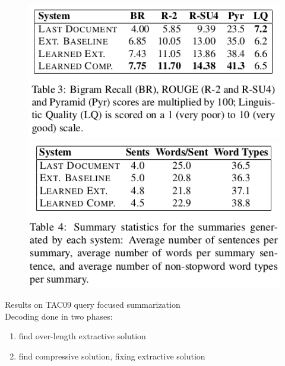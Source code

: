 \documentclass[xcolor={table}]{beamer}
\begin{document}
\begin{frame}[t]{\cite{berg2011jointly}}
      \begin{figure}[h]
          \centering
      \includegraphics[scale=.29]{images/table3-bergkirkpatrick11.png} 
      \includegraphics[scale=.29]{images/table4-bergkirkpatrick11.png} 
  \end{figure}
  Results on TAC09 query focused summarization \\
  Decoding done in two phases: 
  \begin{enumerate}
   \item find over-length extractive solution
   \item find compressive solution, fixing extractive solution
  \end{enumerate}

\end{frame}
\end{document}
